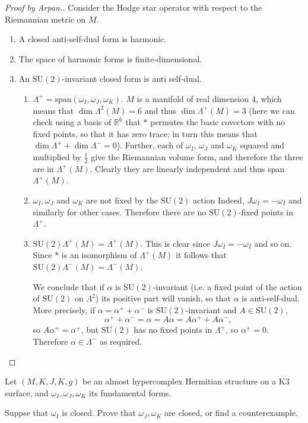 \documentclass{book}
\begin{document}
\begin{proof}[Proof by Arpan.]
Consider the Hodge star operator with respect
to the Riemannian metric on $M$.
\begin{enumerate}
\item A closed anti-self-dual form is
harmonic.
\item The space of harmonic forms is
finite-dimensional.
\item An $\text{SU}(2)$-invariant closed form
is
anti self-dual.
\begin{enumerate}
\item
$\Lambda^+=\text{span}(\omega_I,\omega_J,
\omega_K)$.
$M$ is a manifold of real dimension 4,
which means that $\dim\Lambda^2(M)=6$ and
thus
$\dim\Lambda^+(M)=3$
(here we can check using a basis of
$\mathbb{R}^6$
that $*$ permutes the basic covectors with no
fixed points,
so that it has zero trace;
in turn this means that $\dim \Lambda^+ +
\dim\Lambda^-=0$).
Further, each of $\omega_I$, $\omega_J$ and
$\omega_K$
squared and multiplied by $\frac{1}{2}$ give
the Riemannian
volume form, and therefore the three are in
$\Lambda^+(M)$.
Clearly they are linearly independent and
thus span $\Lambda^+(M)$.

\item $\omega_I,\omega_J$ and $\omega_K$ are
not fixed by the
$\text{SU}(2)$ action
Indeed, $J\omega_I=-\omega_I$ and similarly
for other cases. Therefore there are no
$\text{SU}(2)$-fixed
points in $\Lambda^+$.

\item
$\text{SU}(2)\Lambda^+(M)=\Lambda^+(M)$.
This is clear since $J\omega_I = -\omega_I$
and so on.
Since $*$ is an isomorphism of $\Lambda^+(M)$
it follows that
$\text{SU}(2)\Lambda^-(M)=\Lambda^-(M)$.

\medskip\noindent
We conclude that if $\alpha$ is
$\text{SU}(2)$-invariant (i.e. a fixed point
of
the action of $\text{SU}(2)$ on $\Lambda^2$)
its positive part will vanish, so that
$\alpha$ is anti-self-dual. More precisely,
if
$\alpha = \alpha^+ +\alpha^-$ is
$\text{SU}(2)$-invariant and $A \in
\text{SU}(2)$,
$$
\alpha^+ +\alpha^- = \alpha =
A\alpha=A\alpha^+ + A\alpha^-,
$$
so $A\alpha^+=\alpha^+$, but $\text{SU}(2)$
has no fixed points in $\Lambda^+$, so
$\alpha^+=0$.
Therefore $\alpha \in \Lambda^-$ as required.
\end{enumerate}
\end{enumerate}
\end{proof}

\begin{exercise}
\label{exercise-close-funda-forms-almos}
Let $(M,K,J,K,g)$ be an almost hypercomplex
Hermitian structure
on a K3 surface, and $\omega_I, \omega_J,
\omega_K$
its fundamental forms.

Suppse that $\omega_I$ is closed.
Prove that $\omega_J,\omega_K$ are closed, or
find a counterexample.
\end{exercise}
\end{document}
